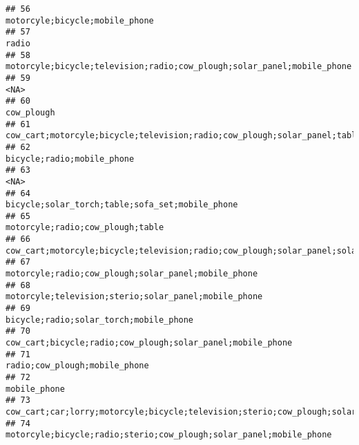 \documentclass[
]{article}
\begin{document}
\begin{verbatim}
## 56                                                                                                            motorcyle;bicycle;mobile_phone
## 57                                                                                                                                     radio
## 58                                                                    motorcyle;bicycle;television;radio;cow_plough;solar_panel;mobile_phone
## 59                                                                                                                                      <NA>
## 60                                                                                                                                cow_plough
## 61                                                     cow_cart;motorcyle;bicycle;television;radio;cow_plough;solar_panel;table;mobile_phone
## 62                                                                                                                bicycle;radio;mobile_phone
## 63                                                                                                                                      <NA>
## 64                                                                                           bicycle;solar_torch;table;sofa_set;mobile_phone
## 65                                                                                                          motorcyle;radio;cow_plough;table
## 66                                               cow_cart;motorcyle;bicycle;television;radio;cow_plough;solar_panel;solar_torch;mobile_phone
## 67                                                                                       motorcyle;radio;cow_plough;solar_panel;mobile_phone
## 68                                                                                      motorcyle;television;sterio;solar_panel;mobile_phone
## 69                                                                                                    bicycle;radio;solar_torch;mobile_phone
## 70                                                                                cow_cart;bicycle;radio;cow_plough;solar_panel;mobile_phone
## 71                                                                                                             radio;cow_plough;mobile_phone
## 72                                                                                                                              mobile_phone
## 73  cow_cart;car;lorry;motorcyle;bicycle;television;sterio;cow_plough;solar_panel;solar_torch;electricity;table;sofa_set;mobile_phone;fridge
## 74                                                                        motorcyle;bicycle;radio;sterio;cow_plough;solar_panel;mobile_phone

\end{verbatim}
\end{document}
